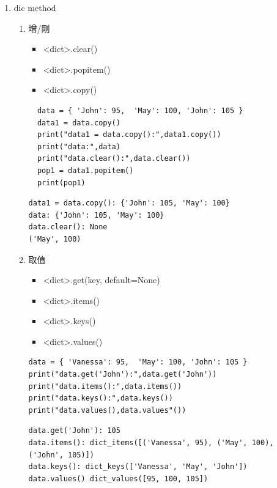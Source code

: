 \documentclass[a4paper,12pt]{article}
\begin{document}
\begin{enumerate}
\item dic method
\label{sec:orgf411f2b}
\begin{enumerate}
\item 增/剛
\label{sec:orgbb6b7f0}
\begin{itemize}
\item <dict>.clear()\\
\item <dict>.popitem()\\
\item <dict>.copy()\\
\end{itemize}
\lstset{breaklines=true,language=Python,label= ,caption= ,captionpos=b,firstnumber=1,numbers=left}
\begin{lstlisting}
  data = { 'John': 95,  'May': 100, 'John': 105 }
  data1 = data.copy()
  print("data1 = data.copy():",data1.copy())
  print("data:",data)
  print("data.clear():",data.clear())
  pop1 = data1.popitem()
  print(pop1)
\end{lstlisting}

\begin{verbatim}
data1 = data.copy(): {'John': 105, 'May': 100}
data: {'John': 105, 'May': 100}
data.clear(): None
('May', 100)
\end{verbatim}

\item 取值
\label{sec:orge68201d}
\begin{itemize}
\item <dict>.get(key, default=None)\\
\item <dict>.items()\\
\item <dict>.keys()\\
\item <dict>.values()\\
\end{itemize}
\lstset{breaklines=true,language=Python,label= ,caption= ,captionpos=b,firstnumber=1,numbers=left}
\begin{lstlisting}
data = { 'Vanessa': 95,  'May': 100, 'John': 105 }
print("data.get('John'):",data.get('John'))
print("data.items():",data.items())
print("data.keys():",data.keys())
print("data.values(),data.values"())
\end{lstlisting}

\begin{verbatim}
data.get('John'): 105
data.items(): dict_items([('Vanessa', 95), ('May', 100), ('John', 105)])
data.keys(): dict_keys(['Vanessa', 'May', 'John'])
data.values() dict_values([95, 100, 105])
\end{verbatim}


\end{enumerate}
\end{enumerate}
\end{document}
